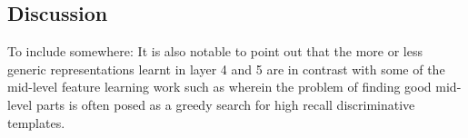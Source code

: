 \subsection{Discussion}
To include somewhere: It is also notable to point out that the more or less generic representations learnt in layer 4 and 5 are in contrast with some of the mid-level feature learning work such as \cite{Blocks} \cite{Mid1} wherein the problem of finding good mid-level parts is often posed as a greedy search for high recall discriminative templates.


